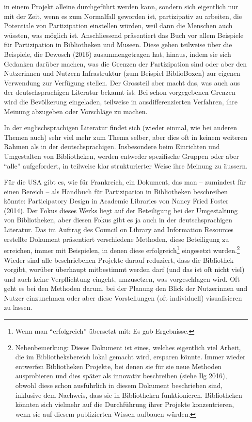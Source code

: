 \documentclass[a4paper,
fontsize=11pt,
oneside,
numbers=noperiodatend,
parskip=half-,
bibliography=totoc,
final
]{scrartcl}
\begin{document}
in einem Projekt alleine durchgeführt werden kann, sondern sich
eigentlich nur mit der Zeit, wenn es zum Normalfall geworden ist,
partizipativ zu arbeiten, die Potentiale von Partizipation einstellen
würden, weil dann die Menschen auch wüssten, was möglich ist.
Anschliessend präsentiert das Buch vor allem Beispiele für Partizipation
in Bibliotheken und Museen. Diese gehen teilweise über die Beispiele,
die Dewosch (2016) zusammengetragen hat, hinaus, indem sie sich Gedanken
darüber machen, was die Grenzen der Partizipation sind oder aber den
Nutzerinnen und Nutzern Infrastruktur (zum Beispiel BiblioBoxen) zur
eigenen Verwendung zur Verfügung stellen. Der Grossteil aber macht das,
was auch aus der deutschsprachigen Literatur bekannt ist: Bei schon
vorgegebenen Grenzen wird die Bevölkerung eingeladen, teilweise in
ausdifferenzierten Verfahren, ihre Meinung abzugeben oder Vorschläge zu
machen.

In der englischsprachigen Literatur findet sich (wieder einmal, wie bei
anderen Themen auch) sehr viel mehr zum Thema selber, aber dies oft in
keinem weiteren Rahmen als in der deutschsprachigen. Insbesondere beim
Einrichten und Umgestalten von Bibliotheken, werden entweder spezifische
Gruppen oder aber \enquote{alle} aufgefordert, in teilweise klar
strukturierter Weise ihre Meinung zu äussern.

Für die USA gibt es, wie für Frankreich, ein Dokument, das man --
zumindest für einen Bereich -- als Handbuch für Partizipation in
Bibliotheken beschreiben könnte: Participatory Design in Academic
Libraries von Nancy Fried Foster (2014). Der Fokus dieses Werks liegt
auf der Beteiligung bei der Umgestaltung von Bibliotheken, aber diesen
Fokus gibt es ja auch in der deutschsprachigen Literatur. Das im Auftrag
des Council on Library and Information Resources erstellte Dokument
präsentiert verschiedene Methoden, diese Beteiligung zu erreichen, immer
mit Beispielen, in denen diese erfolgreich\footnote{Wenn man
  \enquote{erfolgreich} übersetzt mit: Es gab Ergebnisse.} eingesetzt
wurden.\footnote{Nebenbemerkung: Dieses Dokument ist eines, welches
  eigentlich viel Arbeit, die im Bibliotheksbereich lokal gemacht wird,
  ersparen könnte. Immer wieder entwerfen Bibliotheken Projekte, bei
  denen sie für sie neue Methoden ausprobieren und dies später als
  innovativ beschreiben (siehe Ilg 2016), obwohl diese schon ausführlich
  in diesem Dokument beschrieben sind, inklusive dem Nachweis, dass sie
  in Bibliotheken funktionieren. Bibliotheken könnten sich vielmehr auf
  die Durchführung ihrer Projekte konzentrieren, wenn sie auf diesem
  publizierten Wissen aufbauen würden.} Wieder sind alle beschriebenen
Projekte darauf reduziert, dass die Bibliothek vorgibt, worüber
überhaupt mitbestimmt werden darf (und das ist oft nicht viel) und auch
keine Verpflichtung eingeht, umzusetzen, was vorgeschlagen wird. Oft
geht es bei den Methoden darum, bei der Planung den Blick der
Nutzerinnen und Nutzer einzunehmen oder aber diese Vorstellungen (oft
individuell) visualisieren zu lassen.
\end{document}
